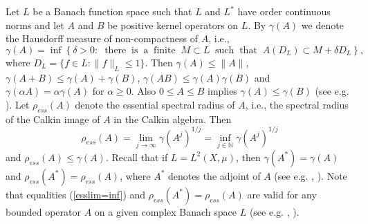\documentclass[12pt, reqno]{amsart}
\theoremstyle{definition}
\theoremstyle{remark}
\numberwithin{equation}{section}
\newcommand{\be}{\begin{equation}}
\newcommand{\ee}{\end{equation}}
\newcommand{\NN}{\mathbb{N}}
\begin{document}
Let $L$ be a Banach function space such that $L$ and $L^*$ have order
continuous norms and let $A$ and $B$ be  positive kernel operators on $L$. By $\gamma (A)$ we denote the Hausdorff measure of
non-compactness of $A$, i.e.,
$$\gamma (A) = \inf\left\{ \delta >0 : \;\; \mathrm{there}\;\; \mathrm{is} \;\; \mathrm{a}\;\; \mathrm{finite}\;\; M \subset L \;\;\mathrm{such} \;\; \mathrm{that} \;\; A(D_L) \subset M + \delta D_L  \right\},$$
where $D_L =\{f\in L : \|f\|_L \le 1\}$. Then $\gamma (A) \le \|A\|$, $\gamma (A+B) \le \gamma (A) + \gamma (B)$, $\gamma(AB) \le \gamma (A)\gamma (B)$ and $\gamma (\alpha A) =\alpha \gamma (A)$ for $\alpha \ge 0$. Also
$0 \le A\le B$  implies $\gamma (A) \le \gamma (B)$ (see e.g. \cite[Corollary 4.3.7 and Corollary 3.7.3]{Me91}). Let $\rho _{ess} (A)$ denote the essential spectral radius of $A$, i.e., the spectral radius of the Calkin image of $A$ in the Calkin algebra. Then
\be
 \rho _{ess} (A) =\lim _{j \to \infty} \gamma (A^j)^{1/j}=\inf _{j \in \NN} \gamma (A^j)^{1/j}
\label{esslim=inf}
\ee
and $\rho _{ess} (A) \le \gamma (A)$. Recall that if $L=L^2(X, \mu)$, then $\gamma (A^*) = \gamma (A)$ and $\rho _{ess} (A^*)=\rho _{ess} (A)  $, where $A^*$ denotes the adjoint of $A$ (see e.g. \cite[Proposition 4.3.3, Theorems 4.3.6 and 4.3.13 and Corollary 3.7.3]{Me91}, \cite[Theorem 1]{Nussbaum70}). Note that equalities (\ref{esslim=inf}) and  $\rho _{ess} (A^*)=\rho _{ess} (A)  $ are valid for any bounded operator $A$ on a given complex Banach space $L$ (see e.g. \cite[Theorem 4.3.13 and Proposition 4.3.11]{Me91}, \cite[Theorem 1]{Nussbaum70}).

\end{document}
